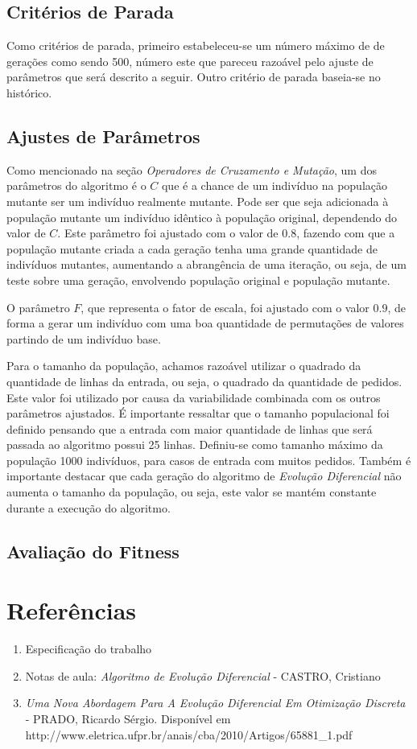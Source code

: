 \documentclass[12pt]{elsarticle}
\begin{document}
	\subsection{Critérios de Parada}
	Como critérios de parada, primeiro estabeleceu-se um número máximo de de gerações como sendo 500, número este que pareceu razoável pelo ajuste de parâmetros que será descrito a seguir. Outro critério de parada baseia-se no histórico. %
	
	\subsection{Ajustes de Parâmetros}
	Como mencionado na seção \textit{Operadores de Cruzamento e Mutação}, um dos parâmetros do algoritmo é o $C$ que é a chance de um indivíduo na população mutante ser um indivíduo realmente mutante. Pode ser que seja adicionada à população mutante um indivíduo idêntico à população original, dependendo do valor de $C$. Este parâmetro foi ajustado com o valor de $0.8$, fazendo com que a população mutante criada a cada geração tenha uma grande quantidade de indivíduos mutantes, aumentando a abrangência de uma iteração, ou seja, de um teste sobre uma geração, envolvendo população original e população mutante.
	
	O parâmetro $F$, que representa o fator de escala, foi ajustado com o valor $0.9$, de forma a gerar um indivíduo com uma boa quantidade de permutações de valores partindo de um indivíduo base.
	
	Para o tamanho da população, achamos razoável utilizar o quadrado da quantidade de linhas da entrada, ou seja, o quadrado da quantidade de pedidos. Este valor foi utilizado por causa da variabilidade combinada com os outros parâmetros ajustados. É importante ressaltar que o tamanho populacional foi definido pensando que a entrada com maior quantidade de linhas que será passada ao algoritmo possui 25 linhas. Definiu-se como tamanho máximo da população 1000 indivíduos, para casos de entrada com muitos pedidos. Também é importante destacar que cada geração do algoritmo de \textit{Evolução Diferencial} não aumenta o tamanho da população, ou seja, este valor se mantém constante durante a execução do algoritmo.
	
	\subsection{Avaliação do Fitness}
	
	\section{Referências}
	\begin{enumerate}
		\item Especificação do trabalho
		\item Notas de aula: \textit{Algoritmo de Evolução Diferencial} - CASTRO, Cristiano
		\item \textit{Uma Nova Abordagem Para A Evolução Diferencial Em Otimização Discreta} - PRADO, Ricardo Sérgio. Disponível em http://www.eletrica.ufpr.br/anais/cba/2010/Artigos/65881\_1.pdf
	\end{enumerate}
	
\end{document}
